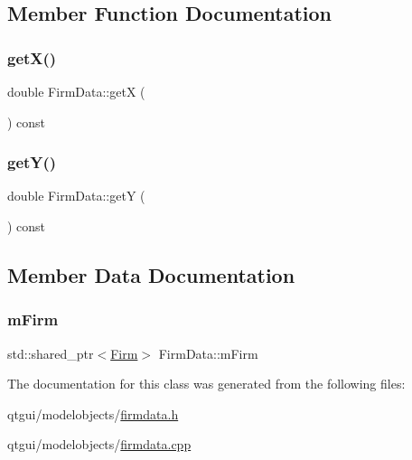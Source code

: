\subsection{Member Function Documentation}
\mbox{\label{class_firm_data_afbab11ece8edfa9b9bc31bbaccaebe87}} 
\subsubsection{\texorpdfstring{getX()}{getX()}}
{\footnotesize\ttfamily double Firm\+Data\+::getX (\begin{DoxyParamCaption}{ }\end{DoxyParamCaption}) const}

\mbox{\label{class_firm_data_a5b22653ebfa412651e2c1bb09dd093fb}} 
\subsubsection{\texorpdfstring{getY()}{getY()}}
{\footnotesize\ttfamily double Firm\+Data\+::getY (\begin{DoxyParamCaption}{ }\end{DoxyParamCaption}) const}



\subsection{Member Data Documentation}
\mbox{\label{class_firm_data_ac3bc4405bf040d4b3b0d4cd7f5fcf3e6}} 
\subsubsection{\texorpdfstring{mFirm}{mFirm}}
{\footnotesize\ttfamily std\+::shared\+\_\+ptr$<$\mbox{\hyperlink{class_firm}{Firm}}$>$ Firm\+Data\+::m\+Firm}



The documentation for this class was generated from the following files\+:\begin{DoxyCompactItemize}
\item 
qtgui/modelobjects/\mbox{\hyperlink{firmdata_8h}{firmdata.\+h}}\item 
qtgui/modelobjects/\mbox{\hyperlink{firmdata_8cpp}{firmdata.\+cpp}}\end{DoxyCompactItemize}
